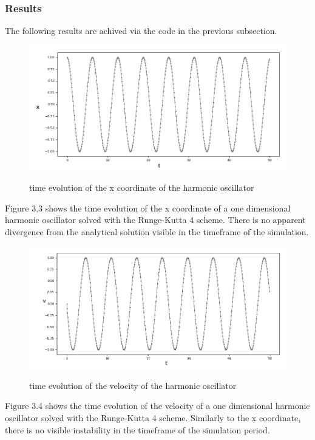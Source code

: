 \documentclass[12pt,a4paper]{article}	%
\begin{document}
\subsubsection{Results}
The following results are achived via the code in the previous subsection. 
\begin{figure}[h!]		
\centering
{\includegraphics[width=1.0\textwidth]{1bx.png}}		
\caption{time evolution of the x coordinate of the harmonic oscillator}
\end{figure}

Figure 3.3 shows the time evolution of the x coordinate of a one dimensional harmonic oscillator solved with the Runge-Kutta 4 scheme. There is no apparent divergence from the analytical solution visible in the timeframe of the simulation.



\begin{figure}[h!]		
\centering
{\includegraphics[width=1.0\textwidth]{1bv.png}}		
\caption{time evolution of the velocity of the harmonic oscillator}
\end{figure}

Figure 3.4 shows the time evolution of the velocity of a one dimensional harmonic oscillator solved with the Runge-Kutta 4 scheme. Similarly to the x coordinate, there is no visible instability in the timeframe of the simulation period. 
\end{document}
